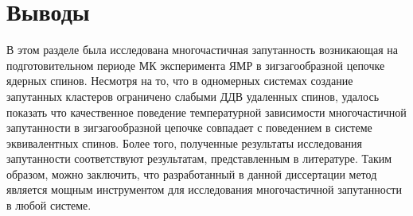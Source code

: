 \section{Выводы}
В этом разделе была исследована многочастичная запутанность
возникающая на подготовительном периоде МК эксперимента ЯМР
в зигзагообразной цепочке ядерных спинов.
Несмотря на то, что в одномерных системах
создание запутанных кластеров ограничено слабыми ДДВ удаленных спинов,
удалось показать что качественное поведение температурной зависимости многочастичной запутанности
в зигзагообразной цепочке совпадает с поведением в системе эквивалентных спинов.
Более того, полученные результаты исследования запутанности
соответствуют результатам, представленным в литературе.
Таким образом, можно заключить,
что разработанный в данной диссертации метод
является мощным инструментом для исследования многочастичной запутанности в любой системе.